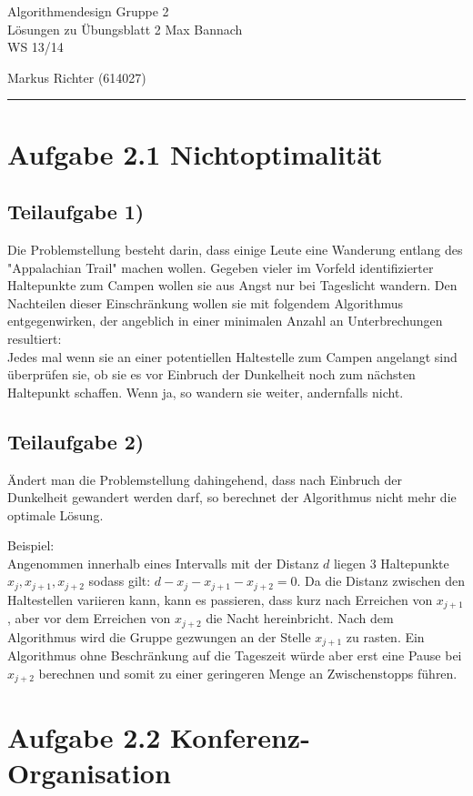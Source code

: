 \documentclass[a4paper, fontsize=10pt]{scrartcl}
\begin{document}
 

{\large Algorithmendesign \hfill Gruppe 2}\\  
{\large Lösungen zu Übungsblatt 2} \hfill Max Bannach\\
{\large WS 13/14}
\begin{flushright}Markus Richter (614027)\end{flushright}
\rule{\textwidth}{.3mm}

\section*{Aufgabe 2.1 Nichtoptimalität}
\subsection*{Teilaufgabe 1)}
Die Problemstellung besteht darin, dass einige Leute eine Wanderung entlang des "Appalachian Trail" machen wollen. Gegeben vieler im Vorfeld identifizierter Haltepunkte zum Campen wollen sie aus Angst nur bei Tageslicht wandern. Den Nachteilen dieser Einschränkung wollen sie mit folgendem Algorithmus entgegenwirken, der angeblich in einer minimalen Anzahl an Unterbrechungen resultiert:  \\
Jedes mal wenn sie an einer potentiellen Haltestelle zum Campen angelangt sind überprüfen sie, ob sie es vor Einbruch der Dunkelheit noch zum nächsten Haltepunkt schaffen. Wenn ja, so wandern sie weiter, andernfalls nicht.
\subsection*{Teilaufgabe 2)}
Ändert man die Problemstellung dahingehend, dass nach Einbruch der Dunkelheit gewandert werden darf, so berechnet der Algorithmus nicht mehr die optimale Lösung.\bigskip

Beispiel:\\
Angenommen innerhalb eines Intervalls mit der Distanz $d$ liegen 3 Haltepunkte $x_j, x_{j+1}, x_{j+2}$ sodass gilt: $d-x_j-x_{j+1}-x_{j+2}=0$. Da die Distanz zwischen den Haltestellen variieren kann, kann es passieren, dass kurz nach Erreichen von $x_{j+1}$, aber vor dem Erreichen von $x_{j+2}$ die Nacht hereinbricht. Nach dem Algorithmus wird die Gruppe gezwungen an der Stelle $x_{j+1}$ zu rasten. Ein Algorithmus ohne Beschränkung auf die Tageszeit würde aber erst eine Pause bei $x_{j+2}$ berechnen und somit zu einer geringeren Menge an Zwischenstopps führen. 
\newpage


\section*{Aufgabe 2.2 Konferenz-Organisation}
\end{document}
